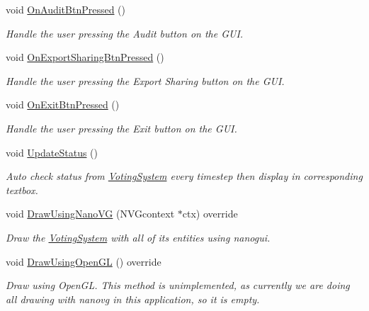 \begin{DoxyCompactItemize}
void \hyperlink{classGraphicsVotingSystemViewer_a75249f28efd57cb648ace4a09b465324}{On\+Audit\+Btn\+Pressed} ()
\begin{DoxyCompactList}\small\item\em Handle the user pressing the Audit button on the G\+UI. \end{DoxyCompactList}\item 
void \hyperlink{classGraphicsVotingSystemViewer_a6f132616969b7fe7ba844e9569912074}{On\+Export\+Sharing\+Btn\+Pressed} ()
\begin{DoxyCompactList}\small\item\em Handle the user pressing the Export Sharing button on the G\+UI. \end{DoxyCompactList}\item 
void \hyperlink{classGraphicsVotingSystemViewer_ae700ed298fe5037131a85e73af208938}{On\+Exit\+Btn\+Pressed} ()
\begin{DoxyCompactList}\small\item\em Handle the user pressing the Exit button on the G\+UI. \end{DoxyCompactList}\item 
\mbox{\label{classGraphicsVotingSystemViewer_a1ef188a4b9d5799967aa10cb8111dbb7}} 
void \hyperlink{classGraphicsVotingSystemViewer_a1ef188a4b9d5799967aa10cb8111dbb7}{Update\+Status} ()
\begin{DoxyCompactList}\small\item\em Auto check status from \hyperlink{classVotingSystem}{Voting\+System} every timestep then display in corresponding textbox. \end{DoxyCompactList}\item 
void \hyperlink{classGraphicsVotingSystemViewer_a01dee1a5993bbbfe5e0fa67f0572557f}{Draw\+Using\+Nano\+VG} (N\+V\+Gcontext $\ast$ctx) override
\begin{DoxyCompactList}\small\item\em Draw the \hyperlink{classVotingSystem}{Voting\+System} with all of its entities using {\ttfamily nanogui}. \end{DoxyCompactList}\item 
\mbox{\label{classGraphicsVotingSystemViewer_a511c1480b1525cf930eedcf463567935}} 
void \hyperlink{classGraphicsVotingSystemViewer_a511c1480b1525cf930eedcf463567935}{Draw\+Using\+Open\+GL} () override
\begin{DoxyCompactList}\small\item\em Draw using {\ttfamily Open\+GL}. This method is unimplemented, as currently we are doing all drawing with {\ttfamily nanovg} in this application, so it is empty. \end{DoxyCompactList}\item 

\end{DoxyCompactItemize}
